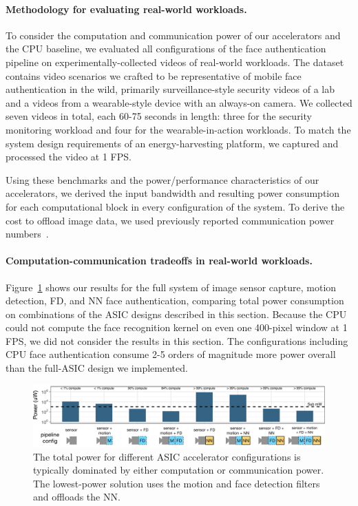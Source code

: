 \paragraph{Methodology for evaluating real-world workloads.} To consider the computation and communication power of our accelerators and the CPU baseline, we evaluated all configurations of the face authentication pipeline on experimentally-collected videos of real-world workloads.
The dataset contains video scenarios we crafted to be representative of mobile face authentication in the wild, primarily surveillance-style security videos of a lab and a videos from a wearable-style device with an always-on camera.
We collected seven videos in total, each 60-75 seconds in length: three for the security monitoring workload and four for the wearable-in-action workloads.
To match the system design requirements of an energy-harvesting platform, we captured and processed the video at 1 FPS.

Using these benchmarks and the power/performance characteristics of our accelerators, we derived the input bandwidth and resulting power consumption for each computational block in every configuration of the system. To derive the cost to offload image data, we used previously reported communication power numbers~\cite{wispcam}.

\paragraph{Computation-communication tradeoffs in real-world workloads.} Figure~\ref{fig:all-face-auth-configs} shows our results for the full system of image sensor capture, motion detection, FD, and NN face authentication, comparing total power consumption on combinations of the ASIC designs described in this section. Because the CPU could not compute the face recognition kernel on even one 400-pixel window at 1 FPS, we did not consider the results in this section. The configurations including CPU face authentication consume 2-5 orders of magnitude more power overall than the full-ASIC design we implemented.


\begin{figure}[h]
\centering
    \begin{center}
      \includegraphics[width=1.0\textwidth]{nsp-figs/FA_compute_comp_v5.pdf}
    \end{center}
    \caption{The total power for different ASIC accelerator configurations is typically dominated by either computation or communication power. The lowest-power solution uses the motion and face detection filters and offloads the NN. }
    \label{fig:all-face-auth-configs}
\end{figure}

